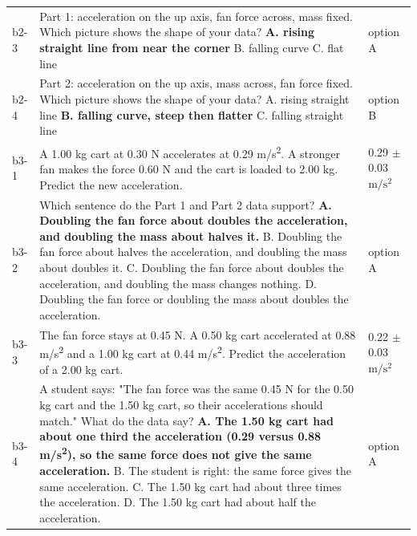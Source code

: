 \documentclass[10pt]{article}
\begin{document}
\begin{longtable}{@{}p{0.4in} p{4.7in} p{1.2in}@{}}
b2-3 & Part 1: acceleration on the up axis, fan force across, mass fixed. Which picture shows the shape of your data? \newline \textbf{A. rising straight line from near the corner} \newline B. falling curve \newline C. flat line & option A \\
b2-4 & Part 2: acceleration on the up axis, mass across, fan force fixed. Which picture shows the shape of your data? \newline A. rising straight line \newline \textbf{B. falling curve, steep then flatter} \newline C. falling straight line & option B \\
b3-1 & A 1.00 kg cart at 0.30 N accelerates at 0.29 m/s\textsuperscript{2}. A stronger fan makes the force 0.60 N and the cart is loaded to 2.00 kg. Predict the new acceleration. & 0.29 $\pm$ 0.03 \ensuremath{\mathrm{m/s^2}} \\
b3-2 & Which sentence do the Part 1 and Part 2 data support? \newline \textbf{A. Doubling the fan force about doubles the acceleration, and doubling the mass about halves it.} \newline B. Doubling the fan force about halves the acceleration, and doubling the mass about doubles it. \newline C. Doubling the fan force about doubles the acceleration, and doubling the mass changes nothing. \newline D. Doubling the fan force or doubling the mass about doubles the acceleration. & option A \\
b3-3 & The fan force stays at 0.45 N. A 0.50 kg cart accelerated at 0.88 m/s\textsuperscript{2} and a 1.00 kg cart at 0.44 m/s\textsuperscript{2}. Predict the acceleration of a 2.00 kg cart. & 0.22 $\pm$ 0.03 \ensuremath{\mathrm{m/s^2}} \\
b3-4 & A student says: "The fan force was the same 0.45 N for the 0.50 kg cart and the 1.50 kg cart, so their accelerations should match." What do the data say? \newline \textbf{A. The 1.50 kg cart had about one third the acceleration (0.29 versus 0.88 m/s\textsuperscript{2}), so the same force does not give the same acceleration.} \newline B. The student is right: the same force gives the same acceleration. \newline C. The 1.50 kg cart had about three times the acceleration. \newline D. The 1.50 kg cart had about half the acceleration. & option A \\
\bottomrule\end{longtable}
\end{document}

